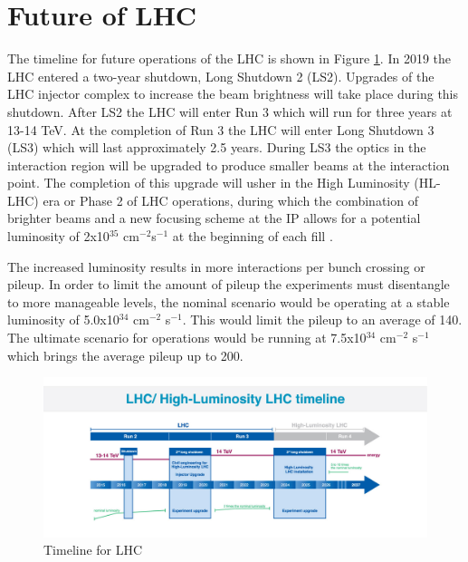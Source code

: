 \section{Future of LHC}
The timeline for future operations of the LHC is shown in Figure \ref{fig:lhctimeline}.  In 2019 the LHC entered a two-year shutdown, Long Shutdown 2 (LS2).  Upgrades of the LHC injector complex to increase the beam brightness will take place during this shutdown.  After LS2 the LHC will enter Run 3 which will run for three years at 13-14 TeV.  At the completion of Run 3 the LHC will enter Long Shutdown 3 (LS3) which will last approximately 2.5 years.  During LS3 the optics in the interaction region will be upgraded to produce smaller beams at the interaction point.  The completion of this upgrade will usher in the High Luminosity (HL-LHC) era or Phase 2 of LHC operations, during which the combination of brighter beams and a new focusing scheme at the IP allows for a potential luminosity of 2x10$^{35}$ cm$^{-2}$s$^{-1}$ at the beginning of each fill \cite{Apollinari:2017cqg}.  

The increased luminosity results in more interactions per bunch crossing or pileup.  In order to limit the amount of pileup the experiments must disentangle to more manageable levels, the nominal scenario would be operating at a stable luminosity of 5.0x10$^{34}$ cm$^{-2}$ s$^{-1}$.  This would limit the pileup to an average of 140.  The ultimate scenario for operations would be running at 7.5x10$^{34}$ cm$^{-2}$ s$^{-1}$ which brings the average pileup up to 200.  


\begin{figure}[h]
	\centering
	\includegraphics[width=0.9\linewidth]{Figures/LHCTimeline}
	\caption[Timeline for LHC]{Timeline for LHC \cite{DeMelis:2063307}}
	\label{fig:lhctimeline}
\end{figure}




